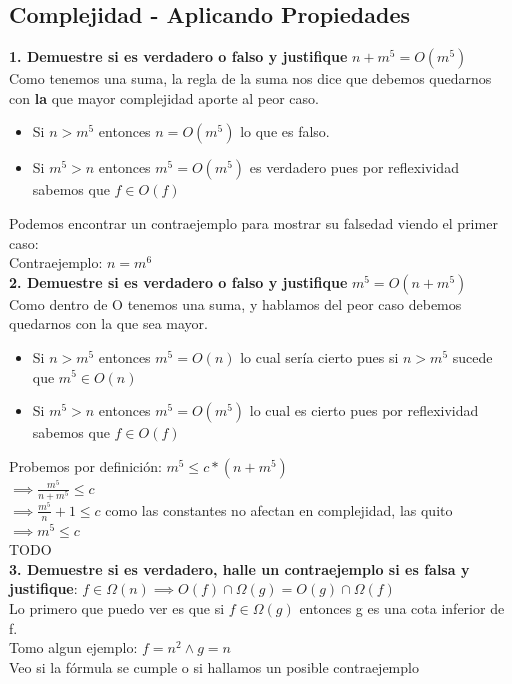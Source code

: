 \documentclass[10pt,a4paper]{article}
\begin{document}
\subsection*{Complejidad - Aplicando Propiedades}
\label{subsec:complejidad_propiedades}
\textbf{1. Demuestre si es verdadero o falso y justifique} $n+m^{5} = O(m^{5})$ \\
Como tenemos una suma, la regla de la suma nos dice que debemos quedarnos con \textbf{la} que mayor complejidad aporte al peor caso.
\begin{itemize}
    \item Si $n > m^{5}$ entonces $ n = O(m^{5})$ lo que es falso.
    \item Si $m^{5} > n$ entonces $ m^{5} = O(m^{5})$ es verdadero pues por reflexividad sabemos que $f \in O(f)$
\end{itemize}
Podemos encontrar un contraejemplo para mostrar su falsedad viendo el primer caso: \\
Contraejemplo: $n=m^{6}$ \\
\textbf{2. Demuestre si es verdadero o falso y justifique} $m^{5} = O(n+m^{5})$ \\
Como dentro de O tenemos una suma, y hablamos del peor caso debemos quedarnos con la que sea mayor.
\begin{itemize}
    \item Si $n > m^{5}$ entonces $m^{5} = O(n)$ lo cual sería cierto pues si $n > m^{5}$ sucede que $m^{5} \in O(n)$
    \item Si $m^{5} > n$ entonces $m^{5} = O(m^5) $ lo cual es cierto pues por reflexividad sabemos que $f \in O(f)$ 
\end{itemize}
Probemos por definición: $ m^{5} \le c \ast (n + m^{5})$ \\
$ \implies \frac{m^{5}}{n+m^{5}} \le c$ \\
$ \implies \frac{m^{5}}{n} + 1 \le c$ como las constantes no afectan en complejidad, las quito  \\
$\implies m^{5} \le c$ \\
TODO \\
\textbf{3. Demuestre si es verdadero, halle un contraejemplo si es falsa y justifique}: $f \in \Omega(n) \implies O(f) \cap \Omega(g) = O(g) \cap \Omega(f)$ \\
Lo primero que puedo ver es que si $ f \in \Omega(g)$ entonces g es una cota inferior de f. \\
Tomo algun ejemplo: $ f = n^{2} \land g = n$ \\
Veo si la fórmula se cumple o si hallamos un posible contraejemplo \\
\end{document}
